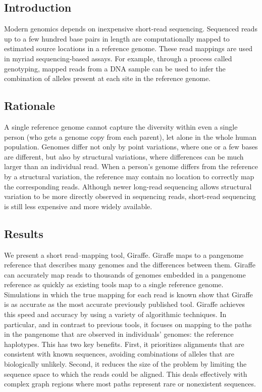 \documentclass[11pt]{ucscthesis}
\begin{document}
\subsection{Introduction}
Modern genomics depends on inexpensive short-read sequencing.
Sequenced reads up to a few hundred base pairs in length are computationally mapped to estimated source locations in a reference genome.
These read mappings are used in myriad sequencing-based assays.
For example, through a process called genotyping, mapped reads from a DNA sample can be used to infer the combination of alleles present at each site in the reference genome.
\subsection{Rationale}
A single reference genome cannot capture the diversity within even a single person (who gets a genome copy from each parent), let alone in the whole human population.
Genomes differ not only by point variations, where one or a few bases are different, but also by structural variations, where differences can be much larger than an individual read.
When a person’s genome differs from the reference by a structural variation, the reference may contain no location to correctly map the corresponding reads.
Although newer long-read sequencing allows structural variation to be more directly observed in sequencing reads, short-read sequencing is still less expensive and more widely available.
\subsection{Results}
We present a short read–mapping tool, Giraffe.
Giraffe maps to a pangenome reference that describes many genomes and the differences between them.
Giraffe can accurately map reads to thousands of genomes embedded in a pangenome reference as quickly as existing tools map to a single reference genome.
Simulations in which the true mapping for each read is known show that Giraffe is as accurate as the most accurate previously published tool.
Giraffe achieves this speed and accuracy by using a variety of algorithmic techniques.
In particular, and in contrast to previous tools, it focuses on mapping to the paths in the pangenome that are observed in individuals’ genomes: the reference haplotypes.
This has two key benefits.
First, it prioritizes alignments that are consistent with known sequences, avoiding combinations of alleles that are biologically unlikely.
Second, it reduces the size of the problem by limiting the sequence space to which the reads could be aligned.
This deals effectively with complex graph regions where most paths represent rare or nonexistent sequences.
\end{document}
